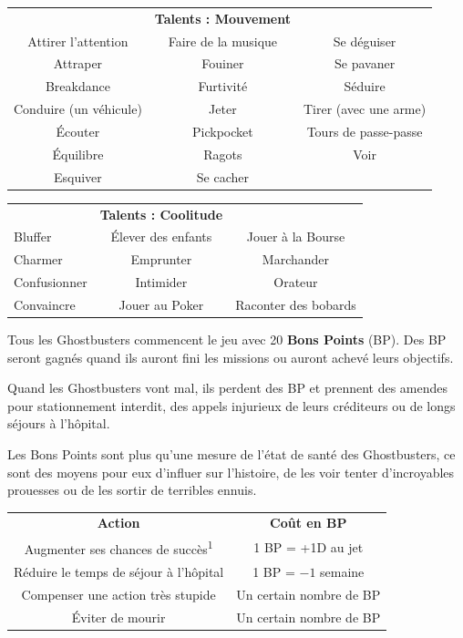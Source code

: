 \begin{frame}[b]
{\begin{minipage}[c][0.95\textheight][c]{\linewidth}
\begin{center}
\begin{tabular}{ccc}
& \textbf{Talents : Mouvement} & \\
Attirer l'attention & Faire de la musique & Se déguiser \\
Attraper & Fouiner & Se pavaner \\
Breakdance & Furtivité & Séduire \\
Conduire (un véhicule) & Jeter & Tirer (avec une arme) \\
Écouter & Pickpocket & Tours de passe-passe \\
Équilibre & Ragots & Voir \\
Esquiver & Se cacher &  \\
\end{tabular}
\end{center}

\begin{center}
\begin{tabular}{>{\centering\arraybackslash}p{2.5cm}cc}
& \textbf{Talents : Coolitude} & \\
Bluffer & Élever des enfants & Jouer à la Bourse \\
Charmer & Emprunter & Marchander \\
Confusionner & Intimider & Orateur \\
Convaincre & Jouer au Poker & Raconter des bobards \\
\end{tabular}
\end{center}


\myindent Tous les Ghostbusters commencent le jeu avec 20 \textbf{Bons Points} (BP). Des BP seront gagnés quand ils auront fini les missions ou auront achevé leurs objectifs.

\myindent Quand les Ghostbusters vont mal, ils perdent des BP et prennent des amendes pour stationnement interdit, des appels injurieux de leurs créditeurs ou de longs séjours à l'hôpital.

\myindent Les Bons Points sont plus qu'une mesure de l'état de santé des Ghostbusters, ce sont des moyens pour eux d'influer sur l'histoire, de les voir tenter d'incroyables prouesses ou de les sortir de terribles ennuis.

\begin{center}
\begin{tabular}{cc}
\textbf{Action} & \textbf{Coût en BP}\\
Augmenter ses chances de succès\textsuperscript{1} & 1 BP = +1D au jet \\
Réduire le temps de séjour à l'hôpital & 1 BP = $-1$ semaine \\
Compenser une action très stupide & Un certain nombre de BP \\
Éviter de mourir & Un certain nombre de BP \\
\end{tabular}
\end{center}


\end{minipage}}
\end{frame}
